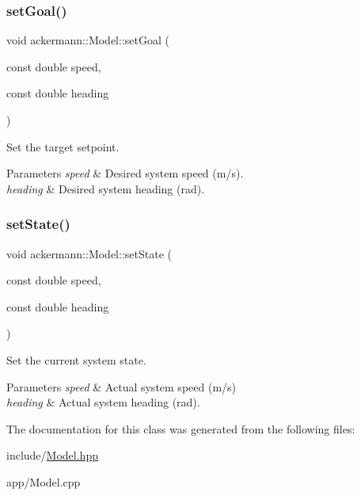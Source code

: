 \subsubsection{\texorpdfstring{set\+Goal()}{setGoal()}}
{\footnotesize\ttfamily void ackermann\+::\+Model\+::set\+Goal (\begin{DoxyParamCaption}\item[{const double}]{speed,  }\item[{const double}]{heading }\end{DoxyParamCaption})}



Set the target setpoint. 


\begin{DoxyParams}{Parameters}
{\em speed} & Desired system speed (m/s). \\
\hline
{\em heading} & Desired system heading (rad). \\
\hline
\end{DoxyParams}
\mbox{\label{classackermann_1_1_model_a109accf55eac34a33c9a5b2b8107e670}} 
\subsubsection{\texorpdfstring{set\+State()}{setState()}}
{\footnotesize\ttfamily void ackermann\+::\+Model\+::set\+State (\begin{DoxyParamCaption}\item[{const double}]{speed,  }\item[{const double}]{heading }\end{DoxyParamCaption})}



Set the current system state. 


\begin{DoxyParams}{Parameters}
{\em speed} & Actual system speed (m/s) \\
\hline
{\em heading} & Actual system heading (rad). \\
\hline
\end{DoxyParams}


The documentation for this class was generated from the following files\+:\begin{DoxyCompactItemize}
\item 
include/\hyperlink{_model_8hpp}{Model.\+hpp}\item 
app/Model.\+cpp\end{DoxyCompactItemize}

